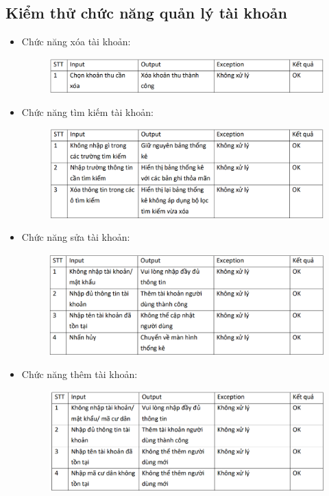 \documentclass{article}
\begin{document}
\subsection{Kiểm thử chức năng quản lý tài khoản}
\begin{itemize}
    \item Chức năng xóa tài khoản:
    \begin{figure}[H]
        \centering
        \includegraphics[width=1\textwidth]{Kiểm thử/KT xóa khoản thu.png}
    \end{figure}
    \newpage
    \item Chức năng tìm kiếm tài khoản:
    \begin{figure}[H]
        \centering
        \includegraphics[width=1\textwidth]{Kiểm thử/Kt tìm kiếm khoản thu.png}
    \end{figure}
    
    \item Chức năng sửa tài khoản:
    \begin{figure}[H]
        \centering
        \includegraphics[width=1\textwidth]{Kiểm thử/KT sửa tài khoản.png}
    \end{figure}
    \item Chức năng thêm tài khoản:
    \begin{figure}[H]
        \centering
        \includegraphics[width=1\textwidth]{Kiểm thử/KT thêm tài khoản.png}
    \end{figure}
\end{itemize}
\newpage
\end{document}
